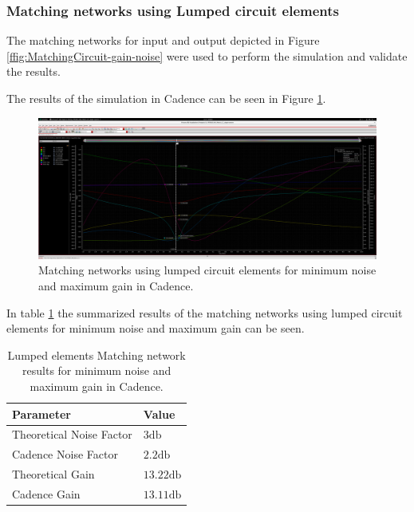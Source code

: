 \subsubsection{Matching networks using Lumped circuit elements}

The matching networks for input and output depicted in Figure \ref{ffig:MatchingCircuit-gain-noise} were used to perform the simulation and validate the results.

The results of the simulation in Cadence can be seen in Figure \ref{fig:CadenceNoiseGainMatchingCircuit}.
\begin{figure}[H]
    \centering
    \includegraphics[width=1\textwidth]{Images/CAD_LCmatchNoiseGain.png}
    \caption{Matching networks using lumped circuit elements for minimum noise and maximum gain in Cadence.}
    \label{fig:CadenceNoiseGainMatchingCircuit}
\end{figure}

In table \ref{tab:NoiseGainMatchingParameters} the summarized results of the matching networks using lumped circuit elements for minimum noise and maximum gain can be seen.
\begin{table}[H]
    \centering
    \caption{Lumped elements Matching network results for minimum noise and maximum gain in Cadence.}
    \begin{tabularx}{\textwidth}{>{\centering\arraybackslash}X >{\centering\arraybackslash}X}
        \toprule
        \textbf{Parameter} & \textbf{Value} \\
        \midrule
        Theoretical Noise Factor  & $3 \si{\decibel}$ \\
        \midrule
        Cadence Noise Factor & $2.2 \si{\decibel}$ \\
        \midrule
        Theoretical Gain & $13.22 \si{\decibel}$ \\
        \midrule
        Cadence Gain & $13.11 \si{\decibel}$ \\
        \bottomrule
    \end{tabularx}
    \label{tab:NoiseGainMatchingParameters}
\end{table}

